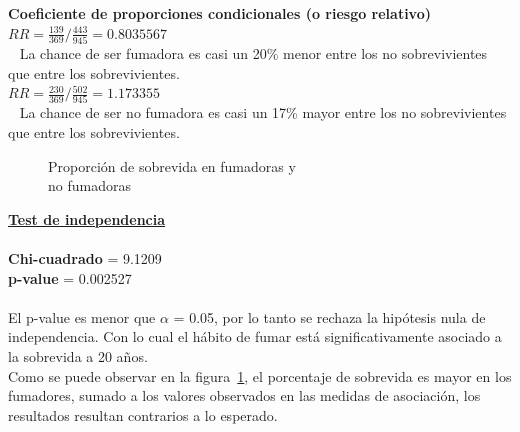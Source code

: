 \documentclass[12pt,letterpaper,fleqn]{article}
\begin{document}
\begin{enumerate}[label=\textbf{\arabic*.}]
\begin{enumerate}[label=\textbf{\alph*.}]
                    \textbf{Coeficiente de proporciones condicionales (o riesgo relativo)}\\
                     $ RR =  \frac{139}{369}/\frac{443}{945} = 0.8035567 $ \\ 
                     La chance de ser fumadora es casi un 20\% menor entre los no sobrevivientes que entre los sobrevivientes.\\
                     $ RR =  \frac{230}{369}/\frac{502}{945} = 1.173355 $ \\ 
                     La chance de ser no fumadora es casi un 17\% mayor entre los no sobrevivientes que entre los sobrevivientes.\\


                    \begin{figure}[!h]
                        \centering
                        
                        \caption{Proporción de sobrevida en fumadoras y \\no fumadoras}
                        \label{fig:figure1}
                    \end{figure}
                    \FloatBarrier
                    \underline{\textbf{Test de independencia}} \\ \\
                    \textbf{Chi-cuadrado} = 9.1209 \\
                    \textbf{p-value} = 0.002527 \\ \\
                     El p-value es menor que $\alpha$ = 0.05, por lo tanto se rechaza la hipótesis nula de independencia. Con lo cual el hábito de fumar está significativamente asociado a la sobrevida a 20 años. \\
                    Como se puede observar en la figura~\ref{fig:figure1}, el porcentaje de sobrevida es mayor en los fumadores, sumado a los valores observados en las medidas de asociación, los resultados resultan contrarios a lo esperado.


\end{enumerate}
\end{enumerate}
\end{document}
